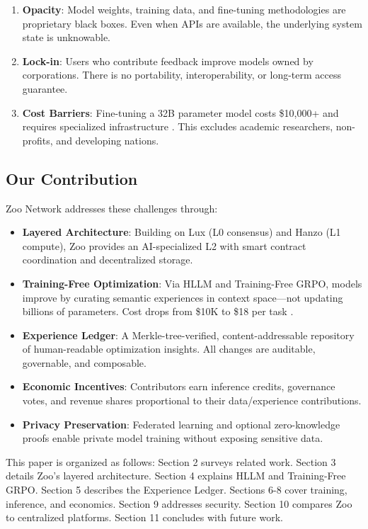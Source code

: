 \documentclass[11pt,a4paper]{article}
\begin{document}
\begin{enumerate}[leftmargin=*]
\item \textbf{Opacity}: Model weights, training data, and fine-tuning methodologies are proprietary black boxes. Even when APIs are available, the underlying system state is unknowable.
\item \textbf{Lock-in}: Users who contribute feedback improve models owned by corporations. There is no portability, interoperability, or long-term access guarantee.
\item \textbf{Cost Barriers}: Fine-tuning a 32B parameter model costs \$10,000+ and requires specialized infrastructure \cite{tencent2025grpo}. This excludes academic researchers, non-profits, and developing nations.
\end{enumerate}

\subsection{Our Contribution}

Zoo Network addresses these challenges through:

\begin{itemize}[leftmargin=*]
\item \textbf{Layered Architecture}: Building on Lux (L0 consensus) and Hanzo (L1 compute), Zoo provides an AI-specialized L2 with smart contract coordination and decentralized storage.
\item \textbf{Training-Free Optimization}: Via HLLM and Training-Free GRPO, models improve by curating semantic experiences in context space—not updating billions of parameters. Cost drops from \$10K to \$18 per task \cite{tencent2025grpo}.
\item \textbf{Experience Ledger}: A Merkle-tree-verified, content-addressable repository of human-readable optimization insights. All changes are auditable, governable, and composable.
\item \textbf{Economic Incentives}: Contributors earn inference credits, governance votes, and revenue shares proportional to their data/experience contributions.
\item \textbf{Privacy Preservation}: Federated learning and optional zero-knowledge proofs enable private model training without exposing sensitive data.
\end{itemize}

This paper is organized as follows: Section 2 surveys related work. Section 3 details Zoo's layered architecture. Section 4 explains HLLM and Training-Free GRPO. Section 5 describes the Experience Ledger. Sections 6-8 cover training, inference, and economics. Section 9 addresses security. Section 10 compares Zoo to centralized platforms. Section 11 concludes with future work.
\end{document}
